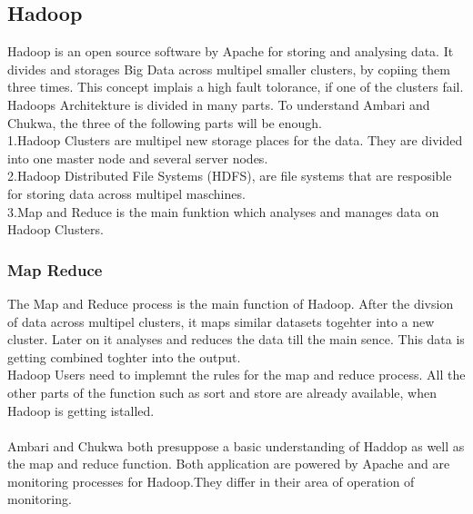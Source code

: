 \subsection{Hadoop}
\label{subsec:Hadoop}
Hadoop is an open source software by Apache for storing and analysing data. It divides and storages Big Data across multipel smaller clusters, by copiing them three times. This concept implais a high fault tolorance, if one of the clusters fail.
 \\
 Hadoops Architekture is divided in many parts. To understand Ambari and Chukwa, the three of the following parts will be enough.
  \\
  1.Hadoop Clusters are multipel new storage places for the data. They are divided into one master node and several server nodes.
  \\
  2.Hadoop Distributed File Systems (HDFS), are file systems that are resposible for storing data across multipel maschines.
  \\
  3.Map and Reduce is the main funktion which analyses and manages data on Hadoop Clusters.
\subsubsection*{Map Reduce}
The Map and Reduce process is the main function of Hadoop. After the divsion of data across multipel clusters, it maps similar datasets togehter into a new cluster. Later on it analyses and reduces the data till the main sence. This data is getting combined toghter into the output. 
\\
Hadoop Users need to implemnt the rules for the map and reduce process. All the other parts of the function such as sort and store are already available, when Hadoop is getting istalled.
\\
\\
Ambari and Chukwa both presuppose a basic understanding of Haddop as well as the map and reduce function. Both application are powered by Apache and are monitoring processes for Hadoop.They differ in their area of operation of monitoring. 